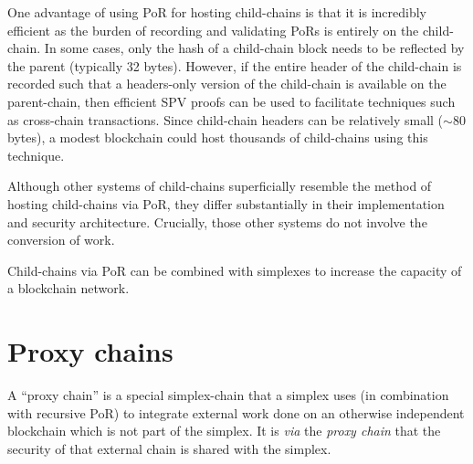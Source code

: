 \documentclass[a4paper,]{article}
\begin{document}
One advantage of using PoR for hosting child-chains is that it is incredibly efficient as the burden of recording and validating PoRs is entirely on the child-chain.
In some cases, only the hash of a child-chain block needs to be reflected by the parent (typically 32 bytes).
However, if the entire header of the child-chain is recorded such that a headers-only version of the child-chain is available on the parent-chain, then efficient SPV proofs can be used to facilitate techniques such as cross-chain transactions.
Since child-chain headers can be relatively small ($\sim 80$ bytes), a modest blockchain could host thousands of child-chains using this technique.

Although other systems of child-chains superficially resemble the method of hosting child-chains via PoR, they differ substantially in their implementation and security architecture.
Crucially, those other systems do not involve the conversion of work.


Child-chains via PoR can be combined with simplexes to increase the capacity of a blockchain network.




\section{Proxy chains}


A ``proxy chain'' is a special simplex-chain that a simplex uses (in combination with recursive PoR) to integrate external work done on an otherwise independent blockchain which is not part of the simplex.
It is \emph{via} the \emph{proxy chain} that the security of that external chain is shared with the simplex.
\end{document}
